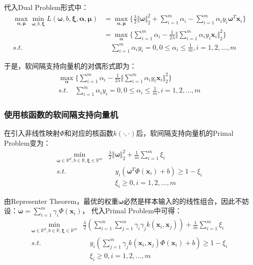 \documentclass[12pt, a4paper]{article}
\newcommand{\ivec}{\bm}
\newcommand{\omegav}{\ivec{\omega}}
\newcommand{\xiv}{\ivec{\xi}}
\newcommand{\alphav}{\ivec{\alpha}}
\newcommand{\muv}{\ivec{\mu}}
\newcommand{\xv}{\ivec{x}}
\begin{document}
        代入Dual Problem形式中：
        \begin{align*}
        \max\limits_{\alphav, \muv} \min\limits_{\omegav, b, \xiv} L(\omegav, b, \xiv, \alphav, \muv)
        &= \max\limits_{\alphav, \muv}\{\frac{\lambda}{2} \Vert \omegav \Vert_2^2 + \sum_{i = 1}^{m} \alpha_i - \sum_{i = 1}^{m} \alpha_i y_i \omegav^T \xv_i\} \\
        &= \max\limits_{\alphav}\{\sum_{i = 1}^{m} \alpha_i - \frac{1}{2 \lambda} \Vert \sum_{i = 1}^{m} \alpha_i y_i \xv_i \Vert_2^2\} \\
        s.t.& \quad \sum_{i = 1}^{m} \alpha_i y_i = 0, 0 \le \alpha_i \le \frac{1}{m}, i = 1, 2, ..., m
        \end{align*}

        于是，软间隔支持向量机的对偶形式即为：
        \begin{align*}
        \max\limits_{\alphav}\{\sum_{i = 1}^{m} \alpha_i - \frac{1}{2 \lambda} \Vert \sum_{i = 1}^{m} \alpha_i y_i \xv_i \Vert_2^2\} \\
        s.t. \quad \sum_{i = 1}^{m} \alpha_i y_i = 0, 0 \le \alpha_i \le \frac{1}{m}, i = 1, 2, ..., m
        \end{align*}

    \subsubsection{使用核函数的软间隔支持向量机}

        在引入非线性映射$\Phi$和对应的核函数$k(·,·)$后，软间隔支持向量机的Primal Problem变为：
        \begin{equation}\begin{aligned}
        \min\limits_{\omegav \in \mathbb{R}^d, b \in \mathbb{R}, \xiv \in \mathbb{R}^m}& \frac{\lambda}{2} \Vert \omegav \Vert_2^2 + \frac{1}{m} \sum_{i = 1}^{m} \xi_i \\
        s.t.& \quad y_i (\omegav^T \Phi(\xv_i) + b) \ge 1 - \xi_i \\
            & \quad \xi_i \ge 0, i = 1, 2, ..., m
        \end{aligned}\end{equation}

        由Representer Theorem，最优的权重$\omegav$必然是样本输入的的线性组合，因此不妨设：$\omegav = \sum_{i = 1}^{m} \gamma_i \Phi(\xv_i)$，
        代入Primal Problem中可得：
        \begin{equation}\begin{aligned}
        \min\limits_{\omegav \in \mathbb{R}^d, b \in \mathbb{R}, \xiv \in \mathbb{R}^m}& \frac{\lambda}{2} (\sum_{i = 1}^{m} \sum_{j = 1}^{m} \gamma_i \gamma_j k(\xv_i, \xv_j)) + \frac{1}{m} \sum_{i = 1}^{m} \xi_i \\
        s.t.& \quad y_i (\sum_{j = 1}^{m} \gamma_j k(\xv_i, \xv_j) \Phi(\xv_i) + b) \ge 1 - \xi_i \\
            & \quad \xi_i \ge 0, i = 1, 2, ..., m
        \end{aligned}\end{equation}
\end{document}
